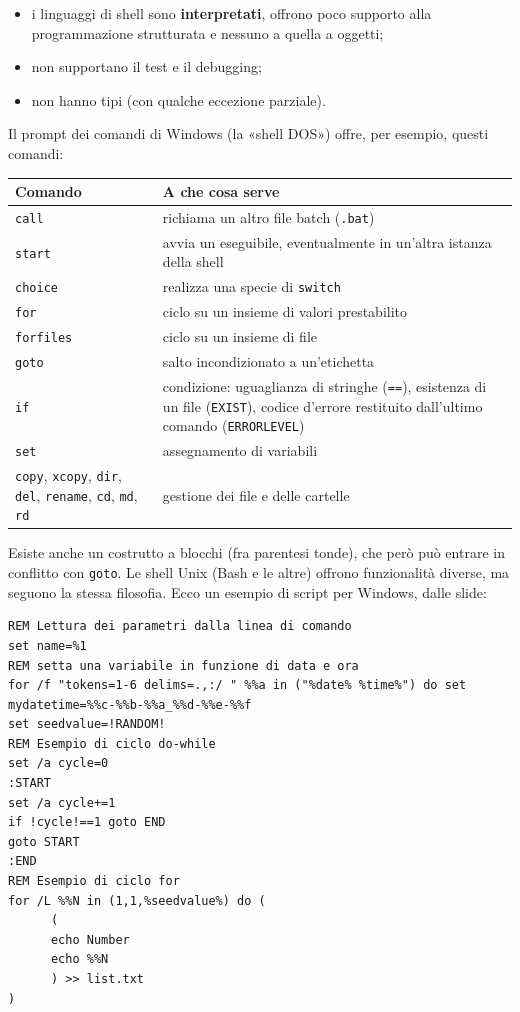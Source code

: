 \begin{itemize}
  \item i linguaggi di shell sono \textbf{interpretati}, offrono poco supporto alla programmazione strutturata e nessuno
        a quella a oggetti;
  \item non supportano il test e il debugging;
  \item non hanno tipi (con qualche eccezione parziale).
\end{itemize}

Il prompt dei comandi di Windows (la «shell DOS») offre, per esempio, questi comandi:

\begin{center}
\renewcommand{\arraystretch}{1.2}
\begin{tabular}{lP{11.6cm}}
\toprule
\textbf{Comando} & \textbf{A che cosa serve} \\
\midrule
\texttt{call} & richiama un altro file batch (\texttt{.bat}) \\
\texttt{start} & avvia un eseguibile, eventualmente in un'altra istanza della shell \\
\texttt{choice} & realizza una specie di \texttt{switch} \\
\texttt{for} & ciclo su un insieme di valori prestabilito \\
\texttt{forfiles} & ciclo su un insieme di file \\
\texttt{goto} & salto incondizionato a un'etichetta \\
\texttt{if} & condizione: uguaglianza di stringhe (\texttt{==}), esistenza di un file (\texttt{EXIST}), codice d'errore
              restituito dall'ultimo comando (\texttt{ERRORLEVEL}) \\
\texttt{set} & assegnamento di variabili \\
\texttt{copy}, \texttt{xcopy}, \texttt{dir}, \texttt{del}, \texttt{rename}, \texttt{cd}, \texttt{md}, \texttt{rd} &
              gestione dei file e delle cartelle \\
\bottomrule
\end{tabular}
\end{center}

Esiste anche un costrutto a blocchi (fra parentesi tonde), che però può entrare in conflitto con \texttt{goto}. Le shell
Unix (Bash e le altre) offrono funzionalità diverse, ma seguono la stessa filosofia. Ecco un esempio di script per
Windows, dalle slide:

\begin{lstlisting}[style=plain, name=esempio.bat]
REM Lettura dei parametri dalla linea di comando
set name=%1
REM setta una variabile in funzione di data e ora
for /f "tokens=1-6 delims=.,:/ " %%a in ("%date% %time%") do set mydatetime=%%c-%%b-%%a_%%d-%%e-%%f
set seedvalue=!RANDOM!
REM Esempio di ciclo do-while
set /a cycle=0
:START
set /a cycle+=1
if !cycle!==1 goto END
goto START
:END
REM Esempio di ciclo for
for /L %%N in (1,1,%seedvalue%) do (
      (
      echo Number
      echo %%N
      ) >> list.txt
)
\end{lstlisting}

